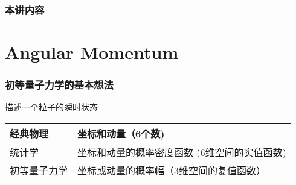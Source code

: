 \documentclass[CJK]{beamer}
\date{}
\begin{document}
  \bch
{}




\begin{frame}
\frametitle{本讲内容}
\tableofcontents
\end{frame}

\section{Angular Momentum}

\begin{frame}
  \frametitle{初等量子力学的基本想法}
  描述一个粒子的瞬时状态
  \begin{tabular}{|l|l|} 
    \hline
    经典物理 &  坐标和动量（6个数) \\
      \hline
      统计学 & 坐标和动量的概率密度函数 (6维空间的实值函数) \\
      \hline
      初等量子力学 & 坐标或动量的概率幅（3维空间的复值函数） \\
    \hline
  \end{tabular}
\end{frame}

\ech
\end{document}

